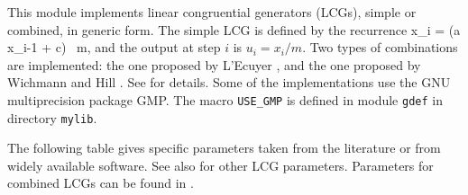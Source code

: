
This module implements linear congruential generators (LCGs),
simple or combined, in generic form.
The simple LCG is defined by the recurrence
\eq
  x_i = (a x_{i-1} + c) \ \mod m,                    \label {lcg}
\endeq
and the output at step $i$ is $u_i = x_i / m$.
Two types of combinations are implemented:
%
the one proposed by L'Ecuyer \cite{rLEC88a}, and the one proposed
by Wichmann and Hill \cite{rWIC82a}.
See \cite{rLEC91b} for details.
Some of the implementations use the GNU multiprecision package GMP. 
The macro {\tt USE\_GMP} is defined in module {\tt gdef} in directory
{\tt mylib}.

The following table gives specific parameters taken from
the literature or from widely available software.
See also \cite{sFIS96a,rLEC99c} for other LCG parameters.
Parameters for combined LCGs can be found in
\cite{rLEC88a,rLEC91b,rLEC97d}.


